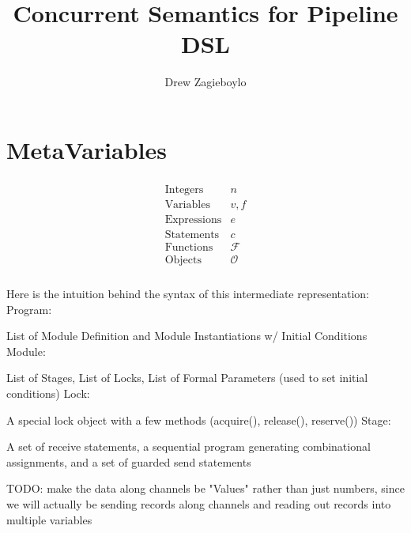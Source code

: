 \documentclass{article}
\begin{document}
\title{Concurrent Semantics for Pipeline DSL}
\author{Drew Zagieboylo}
\maketitle

\section{MetaVariables}
\begin{align*}
  \begin{array}{lc}
    \mbox{Integers} & n \\
    \mbox{Variables} & v,f\\
    \mbox{Expressions} & e\\
    \mbox{Statements} & c\\
    \mbox{Functions} & \mathcal{F}\\
    \mbox{Objects} & \mathcal{O}\\
  \end{array}
\end{align*}

Here is the intuition behind the syntax of this intermediate representation:\newline
Program:

List of Module Definition and Module Instantiations w/ Initial Conditions\newline
Module:

List of Stages, List of Locks, List of Formal Parameters (used to set initial conditions)\newline
Lock:

A special lock object with a few methods (acquire(), release(), reserve())\newline
Stage:

A set of receive statements, a sequential program generating combinational assignments,
and a set of guarded send statements\newline

TODO: make the data along channels be "Values" rather than just numbers, since
we will actually be sending records along channels and reading out records into
multiple variables
\end{document}
